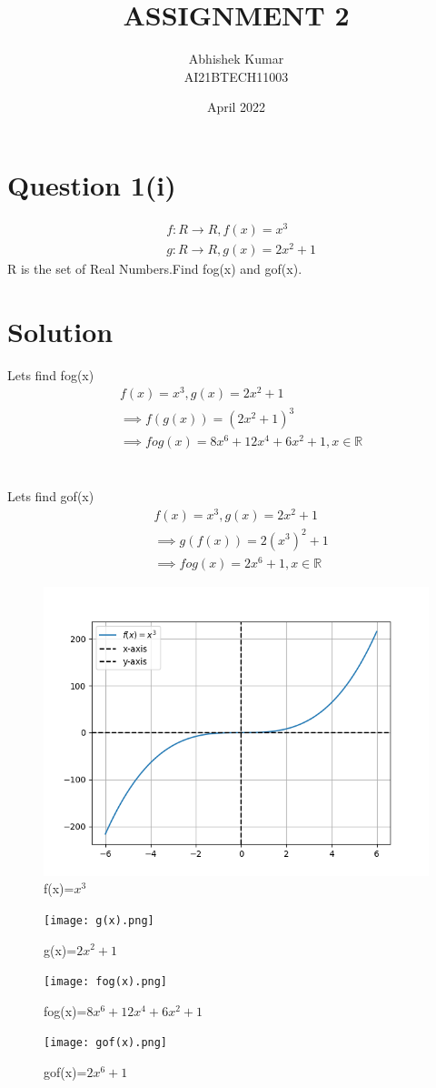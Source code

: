 \documentclass[12pt,a4paper,two column]{article}
\title{ASSIGNMENT 2}
\author{Abhishek Kumar \\AI21BTECH11003}
\date{April 2022}
\begin{document}
	\maketitle
	\section*{Question 1(i)}
	\begin{align}
		&f:R\xrightarrow{} R,f(x)= x^3\\
		&g:R\xrightarrow{} R,g(x)=2x^2+1
	\end{align}
	R is the set of Real Numbers.Find fog(x) and gof(x).
	\section*{Solution}
	Lets find  fog(x)
	\begin{align}
		&f(x)=x^3,g(x)=2x^2+1\nonumber\\
		&\implies f(g(x))= (2x^2+1)^3\\
		&\implies fog(x)=8x^6+12x^4+6x^2+1, x\in \mathbb{R}
	\end{align}\\\\
	Lets find  gof(x)
	\begin{align}
		&f(x)=x^3,g(x)=2x^2+1\nonumber\\
		&\implies g(f(x))= 2(x^3)^2+1\\
		&\implies fog(x)= 2x^6+1,x \in \mathbb{R}
	\end{align}
	\begin{figure}[h]
		\includegraphics[width = \columnwidth]{f(x)}
		\caption{f(x)=$x^3$}
		\label{fig-1}
	\end{figure}
	\begin{figure}
		\centering
		\texttt{[image: g(x).png]}
		\caption{g(x)=$2x^2+1$}
		\label{fig-2}
	\end{figure}
	\begin{figure}
		\centering
		\texttt{[image: fog(x).png]}
		\caption{fog(x)=$8x^6+12x^4+6x^2+1$}
		\label{fig-3}
	\end{figure}
	\begin{figure}
		\centering
		\texttt{[image: gof(x).png]}
		\caption{gof(x)=$2x^6+1$}
		\label{fig-4}
	\end{figure}
	
\end{document}
